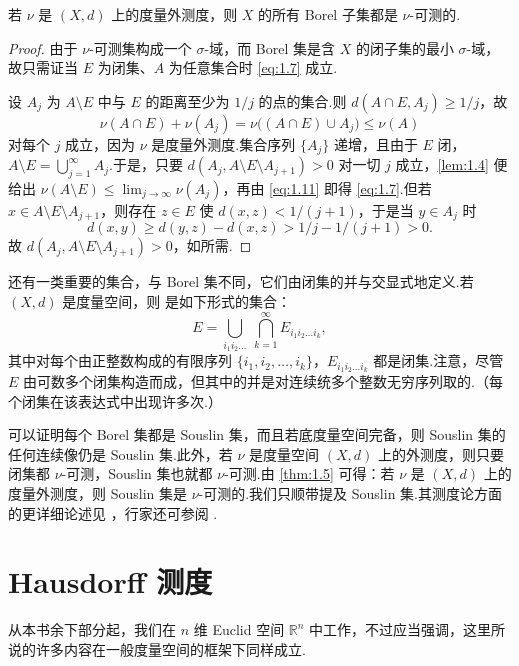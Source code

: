 \begin{theorem}\label{thm:1.5}
若 $\nu$ 是 $(X,d)$ 上的度量外测度，则 $X$ 的所有 Borel 子集都是 $\nu$-可测的.
\end{theorem}

\begin{proof}
由于 $\nu$-可测集构成一个 $\sigma$-域，而 Borel 集是含 $X$ 的闭子集的最小 $\sigma$-域，故只需证当 $E$ 为闭集、$A$ 为任意集合时 \eqref{eq:1.7} 成立.

设 $A_j$ 为 $A\setminus E$ 中与 $E$ 的距离至少为 $1/j$ 的点的集合.则 $d(A\cap E,A_j)\geq 1/j$，故
\begin{equation}\label{eq:1.11}
  \nu(A\cap E)+\nu(A_j)=\nu\bigl((A\cap E)\cup A_j\bigr)\leq\nu(A)
\end{equation}
对每个 $j$ 成立，因为 $\nu$ 是度量外测度.集合序列 $\{A_j\}$ 递增，且由于 $E$ 闭，$A\setminus E=\bigcup_{j=1}^{\infty}A_j$.于是，只要 $d(A_j,A\setminus E\setminus A_{j+1})>0$ 对一切 $j$ 成立，\cref{lem:1.4} 便给出 $\nu(A\setminus E)\leq\lim_{j\to\infty}\nu(A_j)$，再由 \eqref{eq:1.11} 即得 \eqref{eq:1.7}.但若 $x\in A\setminus E\setminus A_{j+1}$，则存在 $z\in E$ 使 $d(x,z)<1/(j+1)$，于是当 $y\in A_j$ 时
\[
  d(x,y)\geq d(y,z)-d(x,z)>1/j-1/(j+1)>0.
\]
故 $d(A_j,A\setminus E\setminus A_{j+1})>0$，如所需.
\end{proof}

还有一类重要的集合，与 Borel 集不同，它们由闭集的并与交显式地定义.若 $(X,d)$ 是度量空间，则  是如下形式的集合：
\[
  E=\bigcup_{i_1i_2\ldots}\ \bigcap_{k=1}^{\infty}E_{i_1i_2\ldots i_k},
\]
其中对每个由正整数构成的有限序列 $\{i_1,i_2,\ldots,i_k\}$，$E_{i_1i_2\ldots i_k}$ 都是闭集.注意，尽管 $E$ 由可数多个闭集构造而成，但其中的并是对连续统多个整数无穷序列取的.（每个闭集在该表达式中出现许多次.）

可以证明每个 Borel 集都是 Souslin 集，而且若底度量空间完备，则 Souslin 集的任何连续像仍是 Souslin 集.此外，若 $\nu$ 是度量空间 $(X,d)$ 上的外测度，则只要闭集都 $\nu$-可测，Souslin 集也就都 $\nu$-可测.由 \cref{thm:1.5} 可得：若 $\nu$ 是 $(X,d)$ 上的度量外测度，则 Souslin 集是 $\nu$-可测的.我们只顺带提及 Souslin 集.其测度论方面的更详细论述见 \textcite{rogers1970}，行家还可参阅 \textcites{rogers1980}.

\section{Hausdorff 测度}


从本书余下部分起，我们在 $n$ 维 Euclid 空间 $\mathbb{R}^n$ 中工作，不过应当强调，这里所说的许多内容在一般度量空间的框架下同样成立.

